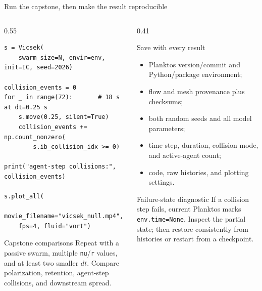 \documentclass[aspectratio=169,11pt]{beamer}
\begin{document}
\begin{frame}[fragile]{Run the capstone, then make the result reproducible}
\footnotesize
\begin{columns}[T,onlytextwidth]
\begin{column}{0.55\textwidth}
\begin{lstlisting}
s = Vicsek(
    swarm_size=N, envir=env, init=IC, seed=2026)

collision_events = 0
for _ in range(72):       # 18 s at dt=0.25 s
    s.move(0.25, silent=True)
    collision_events += np.count_nonzero(
        s.ib_collision_idx >= 0)

print("agent-step collisions:", collision_events)

s.plot_all(
    movie_filename="vicsek_null.mp4",
    fps=4, fluid="vort")
\end{lstlisting}
\begin{block}{Capstone comparisons}
{\footnotesize Repeat with a passive swarm, multiple \texttt{nu}/\texttt{r} values, and at least two smaller \(dt\). Compare polarization, retention, agent-step collisions, and downstream spread.}
\end{block}
\end{column}
\begin{column}{0.41\textwidth}
\begin{block}{Save with every result}
{\scriptsize\begin{itemize}\itemsep0pt
  \item Planktos version/commit and Python/package environment;
  \item flow and mesh provenance plus checksums;
  \item both random seeds and all model parameters;
  \item time step, duration, collision mode, and active-agent count;
  \item code, raw histories, and plotting settings.
\end{itemize}}
\end{block}
\begin{alertblock}{Failure-state diagnostic}
{\scriptsize If a collision step fails, current Planktos marks \texttt{env.time=None}. Inspect the partial state; then restore consistently from histories or restart from a checkpoint.}
\end{alertblock}
\end{column}
\end{columns}
\end{frame}
\end{document}

